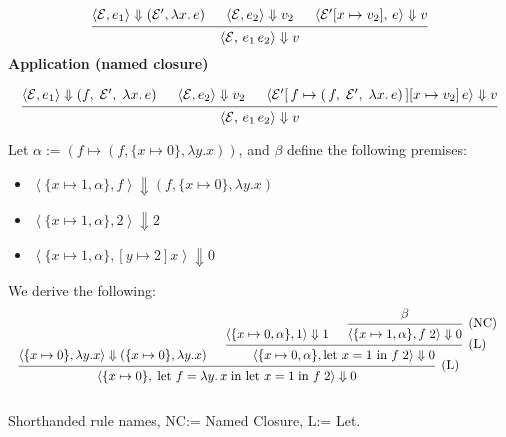 \begin{Def}[LC$^+$ Semantics]
\[
\begin{prooftree}
  \hypo{\langle\mathcal{E}, e_{1}\rangle \Downarrow (\mathcal{E}', \lambda x.\,e)}
  \hypo{\langle\mathcal{E}, e_{2}\rangle \Downarrow v_{2}}
  \hypo{\langle\mathcal{E}'[x \mapsto v_{2}],\, e\rangle \Downarrow v}
  \infer3{
    \langle\mathcal{E},\, e_{1}\,e_{2}\rangle \Downarrow v
  }
\end{prooftree}
\]
\noindent
\textbf{Application (named closure)}

\[
\begin{prooftree}
  \hypo{\langle\mathcal{E}, e_{1}\rangle \Downarrow (f,\;\mathcal{E}',\;\lambda x.\,e)}
  \hypo{\langle\mathcal{E}, e_{2}\rangle \Downarrow v_{2}}
  \hypo{\langle\mathcal{E}'[\,f \mapsto (\,f,\;\mathcal{E}',\;\lambda x.\,e)\,][x \mapsto v_{2}]\,e\rangle \Downarrow v}
  \infer3{
    \langle\mathcal{E},\, e_{1}\,e_{2}\rangle \Downarrow v
  }
\end{prooftree}
\]
\end{Def}

\begin{Example}

    Let $\alpha:= (f \mapsto (f, \{x \mapsto 0\},\lambda y.x))$, and $\beta$ define the following premises:
    \begin{itemize}
        \item $\left\langle \{x \mapsto 1, \alpha\}, f \right\rangle \Downarrow (f,\{x \mapsto 0\},\lambda y.x)$
        \item $\left\langle \{x \mapsto 1, \alpha\}, 2 \right\rangle \Downarrow 2$
        \item $\left\langle \{x \mapsto 1, \alpha\},[y\mapsto 2] x \right\rangle \Downarrow 0$
    \end{itemize}
    \noindent
    We derive the following:
\[
\resizebox{\textwidth}{!}{%
    \begin{prooftree}
        \hypo{\left\langle \{x \mapsto 0 \},\lambda y.x\right\rangle\Downarrow (\{x \mapsto 0 \},\lambda y.x)}
        \hypo{\left\langle \{x \mapsto 0, \alpha\}, 1 \right\rangle \Downarrow 1}
        
        \hypo{\beta }
        \infer1[(NC)]{\left\langle \{x \mapsto 1, \alpha\}, f\; 2 \right\rangle \Downarrow 0}
        \infer2[\text{(L)}]{\left\langle \{x \mapsto 0, \alpha\},\text{let } x = 1\text{ in } f\; 2 \right\rangle \Downarrow 0}
        \infer2[\text{(L)}]{\left\langle \{ x \mapsto 0 \},\; \text{let } f = \lambda y.\,x\; \text{in let } x = 1\; \text{in } f\; 2 \right\rangle \Downarrow 0}
    \end{prooftree}
    }\]
    \\
    \noindent
    Shorthanded rule names, NC:= Named Closure, L:= Let.
\end{Example}
